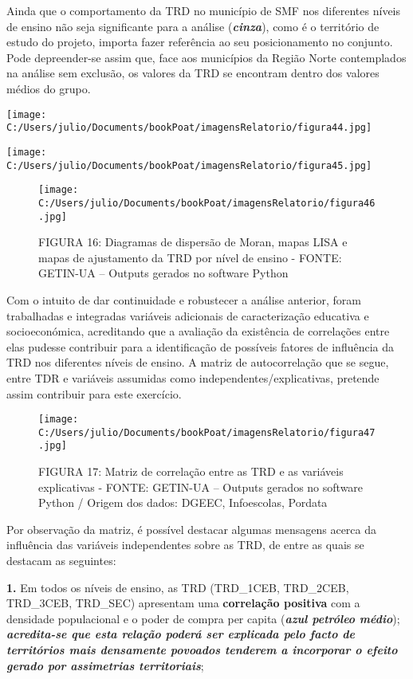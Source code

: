 \documentclass[
]{book}
\begin{document}
Ainda que o comportamento da TRD no município de SMF nos diferentes níveis de ensino não seja significante para a análise (\textbf{\emph{cinza}}), como é o território de estudo do projeto, importa fazer referência ao seu posicionamento no conjunto. Pode depreender-se assim que, face aos municípios da Região Norte contemplados na análise sem exclusão, os valores da TRD se encontram dentro dos valores médios do grupo.

\texttt{[image: C:/Users/julio/Documents/bookPoat/imagensRelatorio/figura44.jpg]}

\texttt{[image: C:/Users/julio/Documents/bookPoat/imagensRelatorio/figura45.jpg]}

\begin{figure}
\centering
\texttt{[image: C:/Users/julio/Documents/bookPoat/imagensRelatorio/figura46.jpg]}
\caption{FIGURA 16: Diagramas de dispersão de Moran, mapas LISA e mapas de ajustamento da TRD por nível de ensino - FONTE: GETIN-UA -- Outputs gerados no software Python}
\end{figure}

Com o intuito de dar continuidade e robustecer a análise anterior, foram trabalhadas e integradas variáveis adicionais de caracterização educativa e socioeconómica, acreditando que a avaliação da existência de correlações entre elas pudesse contribuir para a identificação de possíveis fatores de influência da TRD nos diferentes níveis de ensino. A matriz de autocorrelação que se segue, entre TDR e variáveis assumidas como independentes/explicativas, pretende assim contribuir para este exercício.

\begin{figure}
\centering
\texttt{[image: C:/Users/julio/Documents/bookPoat/imagensRelatorio/figura47.jpg]}
\caption{FIGURA 17: Matriz de correlação entre as TRD e as variáveis explicativas - FONTE: GETIN-UA -- Outputs gerados no software Python / Origem dos dados: DGEEC, Infoescolas, Pordata}
\end{figure}

Por observação da matriz, é possível destacar algumas mensagens acerca da influência das variáveis independentes sobre as TRD, de entre as quais se destacam as seguintes:

\textbf{1.} Em todos os níveis de ensino, as TRD (TRD\_1CEB, TRD\_2CEB, TRD\_3CEB, TRD\_SEC) apresentam uma \textbf{correlação positiva} com a densidade populacional e o poder de compra per capita (\textbf{\emph{azul petróleo médio}}); \textbf{\emph{acredita-se que esta relação poderá ser explicada pelo facto de territórios mais densamente povoados tenderem a incorporar o efeito gerado por assimetrias territoriais}};
\end{document}
